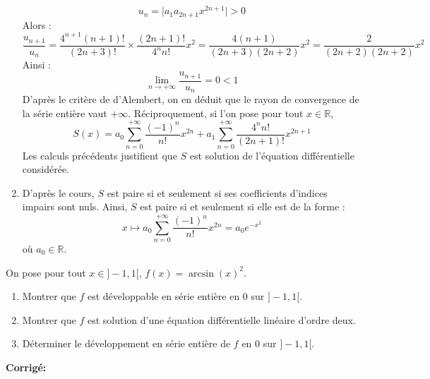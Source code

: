 \documentclass[a4paper,twoside,french,11pt]{VcCours}
\newcommand{\corr}{\textbf{Corrigé:}}
\begin{document}
\begin{enumerate}
$$ u_n = \vert a_1 a_{2n+1} x^{2n+1} \vert >0$$
Alors :
$$ \dfrac{u_{n+1}}{u_n} = \dfrac{4^{n+1} (n+1)!}{(2n+3)!} \times \dfrac{(2n+1)!}{4^n n!} x^2 = \dfrac{4 (n+1)}{(2n+3)(2n+2)}x^2 = \dfrac{2}{(2n+2)(2n+2)} x^2$$
Ainsi :
$$ \lim_{n \rightarrow + \infty} \dfrac{u_{n+1}}{u_n} = 0<1$$
D'après le critère de d'Alembert, on en déduit que le rayon de convergence de la série entière vaut $+ \infty$. Réciproquement, si l'on pose pour tout $x \in \mathbb{R}$,
$$ S(x) = a_0 \sum_{n=0}^{+ \infty} \dfrac{(-1)^n}{n!} x^{2n} + a_1 \sum_{n=0}^{+ \infty} \dfrac{4^n n!}{(2n+1)!} x^{2n+1}$$
Les calculs précédents justifient que $S$ est solution de l'équation différentielle considérée.
\item D'après le cours, $S$ est paire si et seulement si ses coefficients d'indices impairs sont nuls. Ainsi, $S$ est paire si et seulement si elle est de la forme : 
$$ x \mapsto a_0 \sum_{n=0}^{+ \infty} \dfrac{(-1)^n}{n!} x^{2n} = a_0 e^{-x^2}$$
où $a_0 \in \mathbb{R}$.
\end{enumerate}

\begin{Exercice}{} On pose pour tout $x \in ]-1,1[$, $f(x) = \arcsin(x)^2$.

\begin{enumerate}
\item Montrer que $f$ est développable en série entière en $0$ sur $]-1,1[$.
\item Montrer que $f$ est solution d'une équation différentielle linéaire d'ordre deux.
\item Déterminer le développement en série entière de $f$ en $0$ sur $]-1,1[$.
\end{enumerate}
\end{Exercice}

\corr 
\end{document}
